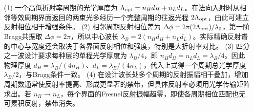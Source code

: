 (1) 一个高低折射率周期的光学厚度为 \(\Lambda_{\rm opt}=n_Hd_H+n_Ld_L\)。在法向入射时从相邻等效周期界面返回的两束光多经历一个完整周期的往返光程 \(2\Lambda_{\rm opt}\)，由此可建立反射相位相干增强条件。
(2) 相邻周期反射相位差为 \(\Delta\phi=2\pi(2\Lambda_{\rm opt})/\lambda_0\)，第一阶Bragg共振取 \(\Delta\phi=2\pi\)，所以中心波长 \(\lambda_B=2(n_Hd_H+n_Ld_L)\)。实际精确反射谱的中心与宽度还会取决于各界面反射相位和强度，特别是大折射率对比。
(3) 四分之一波设计要求每种层的单程光学厚度为 \(\lambda_B/4\)，即 \(n_Hd_H=n_Ld_L=\lambda_B/4\)。因此物理厚度 \(d_H=\lambda_B/(4n_H)\)、\(d_L=\lambda_B/(4n_L)\)，代入上式得一个周期总光学厚度 \(\lambda_B/2\)，与Bragg条件一致。
(4) 在设计波长处多个周期的反射振幅相干叠加，增加周期数通常使反射率提高、形成更显著的禁带，但具体反射率必须用光学传输矩阵求出。若 \(n_H\to n_L\)，每个界面的Fresnel反射振幅趋零，即使各周期相位匹配也无可累积反射，禁带消失。
